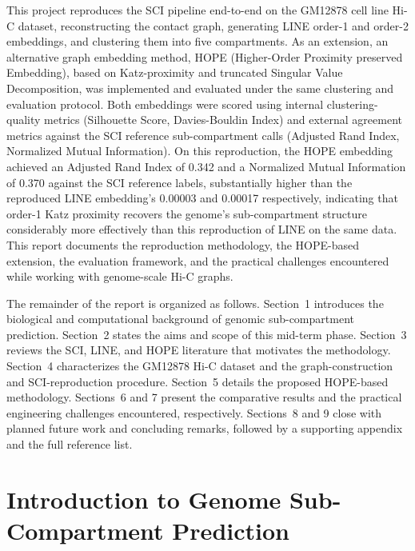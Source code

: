 \documentclass[12pt]{article}
\begin{document}
This project reproduces the SCI pipeline end-to-end on the GM12878 cell line Hi-C dataset,
reconstructing the contact graph, generating LINE order-1 and order-2 embeddings, and clustering
them into five compartments. As an extension, an alternative graph embedding method, HOPE
(Higher-Order Proximity preserved Embedding), based on Katz-proximity and truncated Singular
Value Decomposition, was implemented and evaluated under the same clustering and evaluation
protocol. Both embeddings were scored using internal clustering-quality metrics (Silhouette Score,
Davies-Bouldin Index) and external agreement metrics against the SCI reference sub-compartment
calls (Adjusted Rand Index, Normalized Mutual Information). On this reproduction, the HOPE
embedding achieved an Adjusted Rand Index of 0.342 and a Normalized Mutual Information of
0.370 against the SCI reference labels, substantially higher than the reproduced LINE embedding's
0.00003 and 0.00017 respectively, indicating that order-1 Katz proximity recovers the genome's
sub-compartment structure considerably more effectively than this reproduction of LINE on the
same data. This report documents the reproduction methodology, the HOPE-based extension,
the evaluation framework, and the practical challenges encountered while working with
genome-scale Hi-C graphs.

The remainder of the report is organized as follows. Section~1 introduces the biological and
computational background of genomic sub-compartment prediction. Section~2 states the aims and
scope of this mid-term phase. Section~3 reviews the SCI, LINE, and HOPE literature that motivates
the methodology. Section~4 characterizes the GM12878 Hi-C dataset and the graph-construction
and SCI-reproduction procedure. Section~5 details the proposed HOPE-based methodology.
Sections~6 and 7 present the comparative results and the practical engineering challenges
encountered, respectively. Sections~8 and 9 close with planned future work and concluding
remarks, followed by a supporting appendix and the full reference list.

\clearpage

\section{Introduction to Genome Sub-Compartment Prediction}
\end{document}
